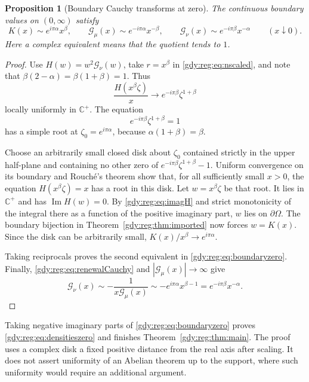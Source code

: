 \documentclass[11pt]{article}
\numberwithin{equation}{section}
\newtheorem{proposition}[theorem]{Proposition}
\theoremstyle{definition}
\theoremstyle{remark}
\DeclareMathOperator{\Ima}{Im}
\begin{document}
\begin{proposition}[Boundary Cauchy transforms at zero]
\label{gdy:reg:prop:boundaryzero}
The continuous boundary values on $(0,\infty)$ satisfy
\begin{equation}\label{gdy:reg:eq:boundaryzero}
 K(x)\sim e^{i\pi\alpha}x^\beta,\qquad
 \mathcal G_\mu(x)\sim e^{-i\pi\alpha}x^{-\beta},\qquad
 \mathcal G_\nu(x)\sim e^{-i\pi\beta}x^{-\alpha}
 \qquad(x\downarrow0).
\end{equation}
Here a complex equivalent means that the quotient tends to $1$.
\end{proposition}
\begin{proof}
Use $H(w)=w^2\mathcal G_\nu(w)$, take $r=x^\beta$ in
\eqref{gdy:reg:eq:nscaled}, and note that
$\beta(2-\alpha)=\beta(1+\beta)=1$.  Thus
\begin{equation}\label{gdy:reg:eq:Hscaled}
 \frac{H(x^\beta\zeta)}x
 \longrightarrow e^{-i\pi\beta}\zeta^{1+\beta}
\end{equation}
locally uniformly in $\mathbb C^+$.
The equation
\[
 e^{-i\pi\beta}\zeta^{1+\beta}=1
\]
has a simple root at
$\zeta_0=e^{i\pi\alpha}$, because
$\alpha(1+\beta)=\beta$.

Choose an arbitrarily small closed disk about $\zeta_0$ contained
strictly in the upper half-plane and containing no other zero of
$e^{-i\pi\beta}\zeta^{1+\beta}-1$.
Uniform convergence on its boundary and Rouch\'e's theorem show that,
for all sufficiently small $x>0$, the equation
$H(x^\beta\zeta)=x$ has a root in this disk.
Let $w=x^\beta\zeta$ be that root.
It lies in $\mathbb C^+$ and has $\Ima H(w)=0$.
By \eqref{gdy:reg:eq:imagH} and strict monotonicity of the integral there
as a function of the positive imaginary part, $w$ lies on
$\partial\Omega$.
The boundary bijection in Theorem~\ref{gdy:reg:thm:imported} now forces
$w=K(x)$.
Since the disk can be arbitrarily small,
$K(x)/x^\beta\to e^{i\pi\alpha}$.

Taking reciprocals proves the second equivalent in
\eqref{gdy:reg:eq:boundaryzero}.  Finally,
\eqref{gdy:reg:eq:renewalCauchy} and
$|\mathcal G_\mu(x)|\to\infty$ give
\[
 \mathcal G_\nu(x)
 \sim-\frac1{x\mathcal G_\mu(x)}
 \sim-e^{i\pi\alpha}x^{\beta-1}
 =e^{-i\pi\beta}x^{-\alpha}.
\]
\end{proof}

Taking negative imaginary parts of
\eqref{gdy:reg:eq:boundaryzero} proves \eqref{gdy:reg:eq:densitieszero} and
finishes Theorem~\ref{gdy:reg:thm:main}.  The proof uses a complex disk a
fixed positive distance from the real axis after scaling.  It does not
assert uniformity of an Abelian theorem up to the support, where such
uniformity would require an additional argument.
\end{document}
